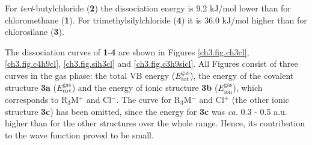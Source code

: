 For \textit{tert}-butylchloride (\textbf{2}) the dissociation energy is 9.2 kJ/mol lower than for chloromethane (\textbf{1}). For trimethylsilylchloride (\textbf{4}) it is 36.0 kJ/mol higher than for chlorosilane (\textbf{3}).

The dissociation curves of \textbf{1}-\textbf{4} are shown in Figures \ref{ch3.fig.ch3cl}, \ref{ch3.fig.c4h9cl}, \ref{ch3.fig.sih3cl} and \ref{ch3.fig.c3h9sicl}. All Figures consist of three curves in the gas phase: the total VB energy ($E_\mathrm{tot}^\mathrm{gas}$), the energy of the covalent structure \textbf{3a} ($E_\mathrm{cov}^\mathrm{gas}$) and the energy of ionic structure \textbf{3b} ($E_\mathrm{ion}^\mathrm{gas}$), which corresponds to R$_3$M$^{+}$ and Cl$^{-}$. The curve for R$_3$M$^{-}$ and Cl$^{+}$ (the other ionic structure \textbf{3c}) has been omitted, since the energy for \textbf{3c} was \textit{ca.} 0.3 - 0.5 a.u. higher than for the other structures over the whole range. Hence, its contribution to the wave function proved to be small.

